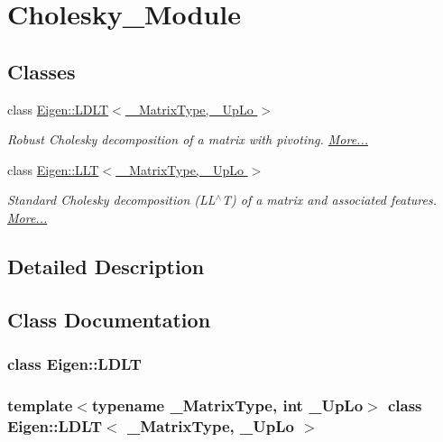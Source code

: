 \hypertarget{group___cholesky___module}{}\section{Cholesky\+\_\+\+Module}
\label{group___cholesky___module}
\subsection*{Classes}
\begin{DoxyCompactItemize}
\item 
class \hyperlink{group___cholesky___module_class_eigen_1_1_l_d_l_t}{Eigen\+::\+L\+D\+L\+T$<$ \+\_\+\+Matrix\+Type, \+\_\+\+Up\+Lo $>$}
\begin{DoxyCompactList}\small\item\em Robust Cholesky decomposition of a matrix with pivoting.  \hyperlink{group___cholesky___module_class_eigen_1_1_l_d_l_t}{More...}\end{DoxyCompactList}\item 
class \hyperlink{group___cholesky___module_class_eigen_1_1_l_l_t}{Eigen\+::\+L\+L\+T$<$ \+\_\+\+Matrix\+Type, \+\_\+\+Up\+Lo $>$}
\begin{DoxyCompactList}\small\item\em Standard Cholesky decomposition (L\+L$^\wedge$T) of a matrix and associated features.  \hyperlink{group___cholesky___module_class_eigen_1_1_l_l_t}{More...}\end{DoxyCompactList}\end{DoxyCompactItemize}


\subsection{Detailed Description}


\subsection{Class Documentation}
\label{class_eigen_1_1_l_d_l_t}
\subsubsection{class Eigen\+:\+:L\+D\+LT}
\subsubsection*{template$<$typename \+\_\+\+Matrix\+Type, int \+\_\+\+Up\+Lo$>$\newline
class Eigen\+::\+L\+D\+L\+T$<$ \+\_\+\+Matrix\+Type, \+\_\+\+Up\+Lo $>$}

